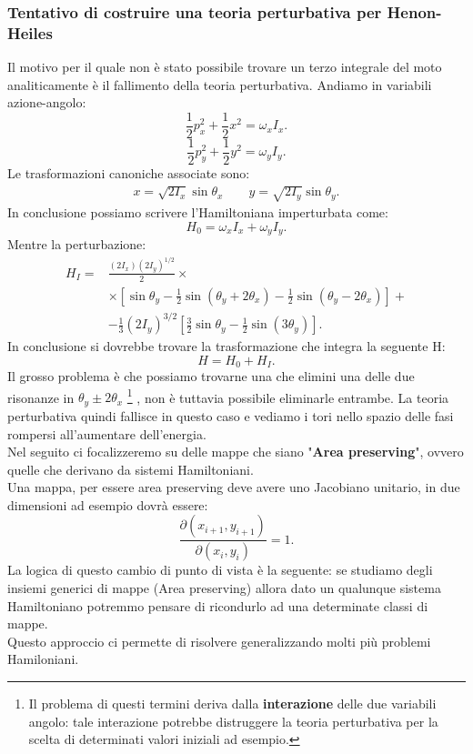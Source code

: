 \subsubsection{Tentativo di costruire una teoria perturbativa per Henon-Heiles}%
\label{subsub:Tentativo di costruire una teoria perturbativa per Henon-Heiles}
Il motivo per il quale non è stato possibile trovare un terzo integrale del moto analiticamente è il fallimento della teoria perturbativa. Andiamo in variabili azione-angolo:
\[
    \frac{1}{2}p_x^2 + \frac{1}{2}x^2 = \omega_xI_x
.\] 
\[
    \frac{1}{2}p_y^2 + \frac{1}{2}y^2 = \omega_yI_y
.\] 
Le trasformazioni canoniche associate sono:
\[\begin{aligned}
    x = \sqrt{2I_x} \sin\theta_x \qquad y = \sqrt{2I_y} \sin\theta_y
.\end{aligned}\]
In conclusione possiamo scrivere l'Hamiltoniana imperturbata come:
\[
    H_0 = \omega_xI_x + \omega_yI_y
.\] 
Mentre la perturbazione:
\[\begin{aligned}
    H_I = &\frac{(2I_x)(2I_y)^{1 /2}}{2}\times\\ 
	  &\times \left[\sin \theta_y-\frac{1}{2}\sin (\theta_y+2\theta_x)-\frac{1}{2}\sin (\theta_y-2\theta_x) \right] + \\
	  & - \frac{1}{3}\left(2I_y\right)^{3 /2}\left[\frac{3}{2}\sin\theta_y-\frac{1}{2}\sin (3\theta_y)\right]
.\end{aligned}\]
In conclusione si dovrebbe trovare la trasformazione che integra la seguente H:
\[
    H = H_0+H_I
.\] 
Il grosso problema è che possiamo trovarne una che elimini una delle due risonanze in $\theta_y\pm 2\theta_x$
\footnote{Il problema di questi termini deriva dalla \textbf{interazione} delle due variabili angolo: tale interazione potrebbe distruggere la teoria perturbativa per la scelta di determinati valori iniziali ad esempio.}
, non è tuttavia possibile eliminarle entrambe. La teoria perturbativa quindi fallisce in questo caso e vediamo i tori nello spazio delle fasi rompersi all'aumentare dell'energia.\\
Nel seguito ci focalizzeremo su delle mappe che siano "\textbf{Area preserving}", ovvero quelle che derivano da sistemi Hamiltoniani.\\
Una mappa, per essere area preserving deve avere uno Jacobiano unitario, in due dimensioni ad esempio dovrà essere:
\[
    \frac{\partial (x_{i+1}, y_{i+1})}{\partial (x_i, y_i)} = 1
.\] 
La logica di questo cambio di punto di vista è la seguente: se studiamo degli insiemi generici di mappe (Area preserving) allora dato un qualunque sistema Hamiltoniano potremmo pensare di ricondurlo ad una determinate classi di mappe. \\
Questo approccio ci permette di risolvere generalizzando molti più problemi Hamiloniani.
